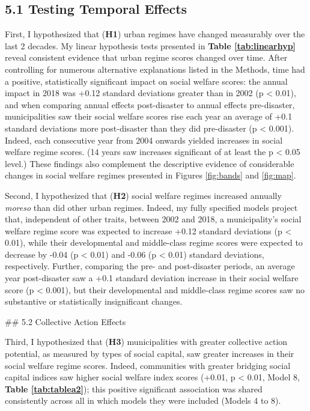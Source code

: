 \documentclass[preprint, 3p,
authoryear]{elsarticle} %
\begin{document}
\newpage
\renewcommand{\arraystretch}{1}
\doublespacing

\hypertarget{testing-temporal-effects}{%
\subsection{5.1 Testing Temporal
Effects}\label{testing-temporal-effects}}

First, I hypothesized that (\textbf{H1}) urban regimes have changed
measurably over the last 2 decades. My linear hypothesis tests presented
in \textbf{Table \ref{tab:linearhyp}} reveal consistent evidence that
urban regime scores changed over time. After controlling for numerous
alternative explanations listed in the Methods, time had a positive,
statistically significant impact on social welfare scores: the annual
impact in 2018 was +0.12 standard deviations greater than in 2002 (p
\textless{} 0.01), and when comparing annual effects post-disaster to
annual effects pre-disaster, municipalities saw their social welfare
scores rise each year an average of +0.1 standard deviations more
post-disaster than they did pre-disaster (p \textless{} 0.001). Indeed,
each consecutive year from 2004 onwards yielded increases in social
welfare regime scores. (14 years saw increases significant of at least
the p \textless{} 0.05 level.) These findings also complement the
descriptive evidence of considerable changes in social welfare regimes
presented in Figures \ref{fig:bands} and \ref{fig:map}.

Second, I hypothesized that (\textbf{H2}) social welfare regimes
increased annually \emph{moreso} than did other urban regimes. Indeed,
my fully specified models project that, independent of other traits,
between 2002 and 2018, a municipality's social welfare regime score was
expected to increase +0.12 standard deviations (p \textless{} 0.01),
while their developmental and middle-class regime scores were expected
to decrease by -0.04 (p \textless{} 0.01) and -0.06 (p \textless{} 0.01)
standard deviations, respectively. Further, comparing the pre- and
post-disaster periods, an average year post-disaster saw a +0.1 standard
deviation increase in their social welfare score (p \textless{} 0.001),
but their developmental and middle-class regime scores saw no
substantive or statistically insignificant changes.

\#\# 5.2 Collective Action Effects

Third, I hypothesized that (\textbf{H3}) municipalities with greater
collective action potential, as measured by types of social capital, saw
greater increases in their social welfare regime scores. Indeed,
communities with greater bridging social capital indices saw higher
social welfare index scores (+0.01, p \textless{} 0.01, Model 8,
\textbf{Table \ref{tab:tablea2}}); this positive significant association
was shared consistently across all in which models they were included
(Models 4 to 8).
\end{document}

